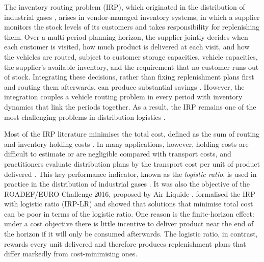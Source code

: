 \documentclass{article}
\begin{document}
The inventory routing problem (IRP), which originated in the distribution of
industrial gases \citep{bell1983improving}, arises in vendor-managed inventory
systems, in which a supplier monitors the stock levels of its customers and
takes responsibility for replenishing them. Over a multi-period planning
horizon, the supplier jointly decides when each customer is visited, how much
product is delivered at each visit, and how the vehicles are routed, subject
to customer storage capacities, vehicle capacities, the supplier's available inventory, and the requirement that
no customer runs out of stock. Integrating these decisions, rather than
fixing replenishment plans first and routing them afterwards, can produce
substantial savings \citep{archetti2016inventory}. However, the integration
couples a vehicle routing problem in every period with inventory dynamics
that link the periods together. As a result, the IRP remains one of the most
challenging problems in distribution logistics
\citep{moin2007overview,bertazzi2012inventory,coelho2014thirty,ekcsi2026inventory}.

Most of the IRP literature minimises the total cost, defined as the sum of
routing and inventory holding costs \citep{bertazzi2012inventory,coelho2014thirty}. In many applications, however, holding
costs are difficult to estimate or are negligible compared with transport
costs, and practitioners evaluate distribution plans by the transport cost
per unit of product delivered \citep{benoist2011randomized}. This key performance indicator, known as the
\emph{logistic ratio}, is used in practice in the distribution of industrial
gases \citep{benoist2011randomized}.
It was also the objective of the ROADEF/EURO Challenge 2016, proposed by
Air Liquide \citep{andre2020roadef}. \citet{archetti2017logistic} formalised
the IRP with logistic ratio (IRP-LR) and showed that solutions that minimise
total cost can be poor in terms of the logistic ratio. One reason is the
finite-horizon effect: under a cost objective there is little incentive to
deliver product near the end of the horizon if it will only be consumed
afterwards. The logistic ratio, in contrast, rewards every unit delivered
and therefore produces replenishment plans that differ markedly from
cost-minimising ones.
\end{document}

